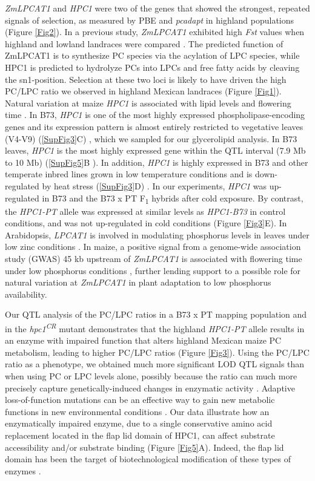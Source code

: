 \documentclass[9pt,twocolumn,twoside,lineno]{biorxiv}
\begin{document}
\textit{ZmLPCAT1} and \textit{HPC1} were two of the genes that showed the strongest, repeated signals of selection, as measured by PBE and \textit{pcadapt} in highland populations (Figure \ref{Fig2}). 
In a previous study, \textit{ZmLPCAT1} exhibited high \textit{Fst} values when highland and lowland landraces were compared \cite{Takuno2015-uj}.
The predicted function of ZmLPCAT1 is to synthesize PC species via the acylation of LPC species, while HPC1 is predicted to hydrolyze PCs into LPCs and free fatty acids by cleaving the sn1-position.
Selection at these two loci is likely to have driven the high PC/LPC ratio we observed in highland Mexican landraces (Figure \ref{Fig1}).
Natural variation at maize \textit{HPC1} is associated with lipid levels \cite{Riedelsheimer2012-bx} and flowering time \cite{Chen2012-gg, Hung2012-ms}. 
In B73, \textit{HPC1} is one of the most highly expressed phospholipase-encoding genes and its expression pattern is almost entirely restricted to vegetative leaves (V4-V9) (\ref{SupFig3}C) \cite{Stelpflug2016-vr}, which we sampled for our glycerolipid analysis. 
In B73 leaves, \textit{HPC1} is the most highly expressed gene within  the QTL interval (7.9 Mb to 10 Mb) (\ref{SupFig5}B \cite{Stelpflug2016-vr}).
In addition, \textit{HPC1} is highly expressed in B73 and other temperate inbred lines grown in low temperature conditions and is down-regulated by heat stress (\ref{SupFig3}D) \cite{Waters2017-nat}.
In our experiments, \textit{HPC1} was up-regulated in B73 and the B73 x PT F\textsubscript{1} hybrids after cold exposure. 
By contrast, the \textit{HPC1-PT} allele was expressed at similar levels as \textit{HPC1-B73} in control conditions, and was not up-regulated in cold conditions (Figure \ref{Fig3}E).
In Arabidopsis, \textit{LPCAT1} is involved in modulating phosphorus levels in leaves under low zinc conditions \cite{Kisko2018-zm}.
In maize, a positive signal from a genome-wide association study (GWAS) 45 kb upstream of \textit{ZmLPCAT1} is associated with flowering time under low phosphorus conditions \cite{xu2018a}, further lending support to a possible role for natural variation at \textit{ZmLPCAT1} in plant adaptation to low phosphorus availability. 

Our QTL analysis of the PC/LPC ratios in a B73 x PT mapping population and in the \textit{hpc1\textsuperscript{CR}} mutant demonstrates that the highland \textit{HPC1-PT} allele results in an enzyme with impaired function that alters highland Mexican maize PC metabolism, leading to higher PC/LPC ratios (Figure \ref{Fig3}). 
Using the PC/LPC ratio as a phenotype, we obtained much more significant LOD QTL signals than when using PC or LPC levels alone, possibly because the ratio can much more precisely capture genetically-induced changes in enzymatic activity \cite{Petersen2012-ii}.
Adaptive loss-of-function mutations can be an effective way to gain new metabolic functions in new environmental conditions \cite{Hottes2013-np}. 
Our data illustrate how an enzymatically impaired enzyme, due to a single conservative amino acid replacement located in the flap lid domain of HPC1,  can affect substrate  accessibility and/or substrate binding (Figure \ref{Fig5}A). 
Indeed, the flap lid domain has been the target of biotechnological modification of these types of enzymes \cite{Khan2017-ua}.
\end{document}
